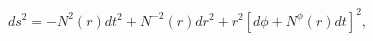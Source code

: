 \begin{equation}
ds^{2}=-N^{2}\left( r\right) dt^{2}+N^{-2}\left( r\right) dr^{2}
+r^{2}\left[d\phi +N^{\phi }\left( r\right) dt\right] ^{2},
\label{btz}
\end{equation}


